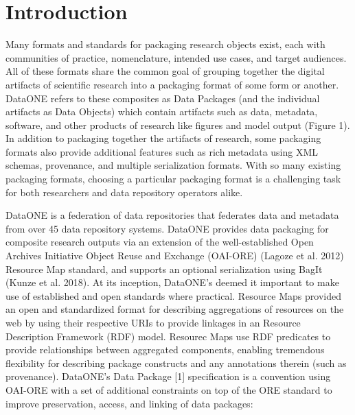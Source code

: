\documentclass[conference]{IEEEtran}
\begin{document}
\section{Introduction}

Many formats and standards for packaging research objects exist, each with communities of practice, nomenclature, intended use cases, and target audiences.
All of these formats share the common goal of grouping together the digital artifacts of scientific research into a packaging format of some form or another.
DataONE refers to these composites as Data Packages (and the individual artifacts as Data Objects) which contain artifacts such as data, metadata, software, and other products of research like figures and model output (Figure 1).
In addition to packaging together the artifacts of research, some packaging formats also provide additional features such as rich metadata using XML schemas, provenance, and multiple serialization formats. With so many existing packaging formats, choosing a particular packaging format is a challenging task for both researchers and data repository operators alike.

DataONE is a federation of data repositories that federates data and metadata from over 45 data repository systems.
DataONE provides data packaging for composite research outputs via an extension of the well-established Open Archives Initiative Object Reuse and Exchange (OAI-ORE) (Lagoze et al. 2012) Resource Map standard, and supports an optional serialization using BagIt (Kunze et al. 2018). 
At its inception, DataONE’s deemed it important to make use of established and open standards where practical.
Resource Maps provided an open and standardized format for describing aggregations of resources on the web by using their respective URIs to provide linkages in an Resource Description Framework (RDF) model. Resourec Maps use RDF predicates to provide relationships between aggregated components, enabling tremendous flexibility for describing package constructs and any annotations therein (such as provenance). DataONE’s Data Package [1] specification is a convention using OAI-ORE with a set of additional constraints on top of the ORE standard to improve preservation, access, and linking of data packages:
\end{document}

